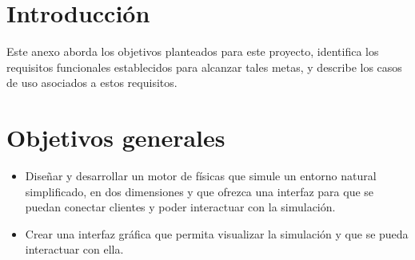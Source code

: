 
\section{Introducción}
Este anexo aborda los objetivos planteados para este proyecto, identifica los requisitos funcionales establecidos para alcanzar tales metas, y describe los casos de uso asociados a estos requisitos.
\section{Objetivos generales}
\begin{itemize}
    \item Diseñar y desarrollar un motor de físicas que simule un entorno natural simplificado, en dos dimensiones y que ofrezca una interfaz para que se puedan conectar clientes  y poder interactuar con la simulación.
    \item Crear una interfaz gráfica que permita visualizar la simulación y que se pueda interactuar con ella.
\end{itemize}
